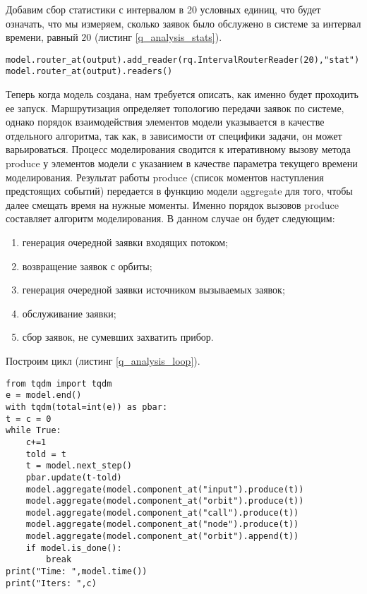 Добавим сбор статистики с интервалом в 20 условных единиц, что будет означать, что мы измеряем, сколько заявок было обслужено в системе за интервал времени, равный $20$ (листинг \ref{q_analysis_stats}).

\begin{lstlisting}
model.router_at(output).add_reader(rq.IntervalRouterReader(20),"stat")
model.router_at(output).readers()
\end{lstlisting}

Теперь когда модель создана, нам требуется описать, как именно будет проходить ее запуск. Маршрутизация определяет топологию передачи заявок по системе, однако порядок взаимодействия элементов модели указывается в качестве отдельного алгоритма, так как, в зависимости от специфики задачи, он может варьироваться.
Процесс моделирования сводится к итеративному вызову метода produce у элементов модели с указанием в качестве параметра текущего времени моделирования. Результат работы produce (список моментов наступления предстоящих событий) передается в функцию модели aggregate для того, чтобы далее смещать время на нужные моменты. Именно порядок вызовов produce составляет алгоритм моделирования. В данном случае он будет следующим:
\begin{enumerate}
	\item генерация очередной заявки входящих потоком;
	\item возвращение заявок с орбиты;
	\item генерация очередной заявки источником вызываемых заявок;
	\item обслуживание заявки;
	\item сбор заявок, не сумевших захватить прибор.
\end{enumerate}

Построим цикл (листинг \ref{q_analysis_loop}).
\begin{lstlisting}
from tqdm import tqdm
e = model.end()
with tqdm(total=int(e)) as pbar:     
t = c = 0
while True:
    c+=1 
    told = t
    t = model.next_step()
    pbar.update(t-told)
    model.aggregate(model.component_at("input").produce(t))
    model.aggregate(model.component_at("orbit").produce(t))
    model.aggregate(model.component_at("call").produce(t))
    model.aggregate(model.component_at("node").produce(t))
    model.aggregate(model.component_at("orbit").append(t))
    if model.is_done():
        break
print("Time: ",model.time())
print("Iters: ",c)
\end{lstlisting}

